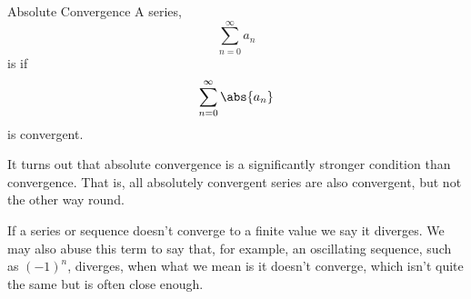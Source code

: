 \documentclass[fleqn]{NotesClass}
\begin{document}
    \begin{dfn}{Absolute Convergence}{}
        A series,
        \begin{equation}
            \sum_{n=0}^{\infty} a_n
        \end{equation}
        is  if
        \begin{equation}
            \sum_{n=0}^{\infty} \abs{a_n}
        \end{equation}
        is convergent.
    \end{dfn}
    It turns out that absolute convergence is a significantly stronger condition than convergence.
    That is, all absolutely convergent series are also convergent, but not the other way round.
    
    If a series or sequence doesn't converge to a finite value we say it diverges.
    We may also abuse this term to say that, for example, an oscillating sequence, such as \((-1)^{n}\), diverges, when what we mean is it doesn't converge, which isn't quite the same but is often close enough.
    
\end{document}

